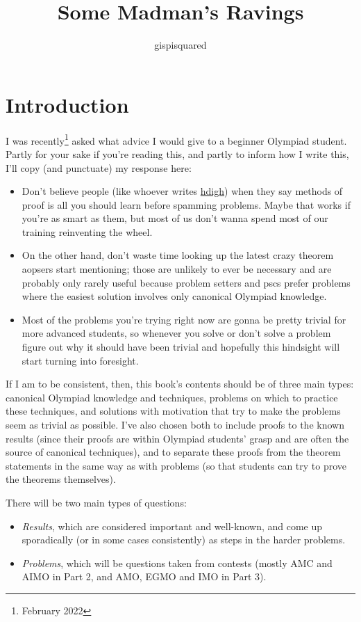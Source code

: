 \documentclass{amsart}
\title{Some Madman's Ravings}
\author{gispisquared}
\begin{document}
\maketitle
\tableofcontents
\newpage
\section*{Introduction}
I was recently\footnote{February 2022} asked what advice I would give to a
beginner Olympiad student. Partly for your sake if you're reading this, and
partly to inform how I write this, I'll copy (and punctuate) my response here:
\begin{itemize}
  \item Don't believe people (like whoever writes
    \href{https://how-did-i-get-here.com/olympiad/}{hdigh}) when they say methods
    of proof is all you should learn before spamming problems. Maybe that works
    if you're as smart as them, but most of us don't wanna spend most of our
    training reinventing the wheel.
  \item On the other hand, don't waste time looking up the latest crazy theorem
    aopsers start mentioning; those are unlikely to ever be necessary and are
    probably only rarely useful because problem setters and pscs prefer problems
    where the easiest solution involves only canonical Olympiad knowledge.
  \item Most of the problems you're trying right now are gonna be pretty
    trivial for more advanced students, so whenever you solve or
    don't solve a problem figure out why it should have been trivial and
    hopefully this hindsight will start turning into foresight.
\end{itemize}

If I am to be consistent, then, this book's contents should be of three main
types: canonical Olympiad knowledge and techniques, problems on which to
practice these techniques, and solutions with motivation that try to make the
problems seem as trivial as possible. I've also chosen both to include proofs to
the known results (since their proofs are within Olympiad students' grasp and
are often the source of canonical techniques), and to separate these proofs from
the theorem statements in the same way as with problems (so that
students can try to prove the theorems themselves).

There will be two main types of questions:
\begin{itemize}
  \item \emph{Results}, which are considered important and well-known, and come
    up sporadically (or in some cases consistently) as steps in the harder
    problems.
  \item \emph{Problems}, which will be questions taken from contests (mostly AMC
    and AIMO in Part 2, and AMO, EGMO and IMO in Part 3).
\end{itemize}
\end{document}
